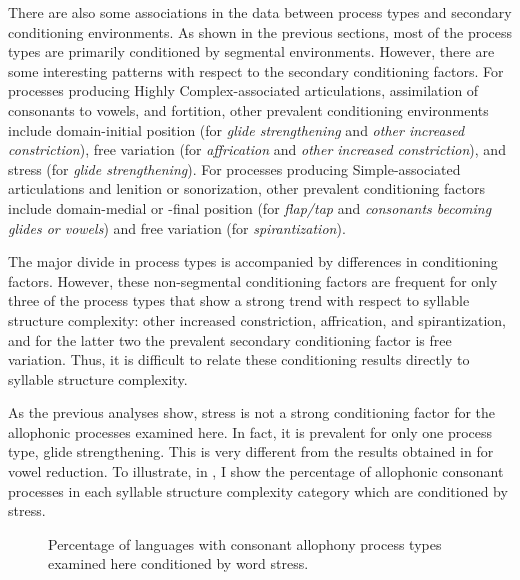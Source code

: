   There are also some associations in the data between process types and secondary conditioning environments. As shown in the previous sections, most of the process types are primarily conditioned by segmental environments. However, there are some interesting patterns with respect to the secondary conditioning factors. For processes producing Highly Complex-associated articulations, assimilation of consonants to vowels, and fortition, other prevalent conditioning environments include domain-initial position (for \textit{glide strengthening} and \textit{other increased constriction}), free variation (for \textit{affrication} and \textit{other increased constriction}), and stress (for \textit{glide strengthening}). For processes producing Simple-associated articulations and lenition or sonorization, other prevalent conditioning factors include domain-medial or -final position (for \textit{flap/tap} and \textit{consonants becoming glides or vowels}) and free variation (for \textit{spirantization}). 

  The major divide in process types is accompanied by differences in conditioning factors. However, these non-segmental conditioning factors are frequent for only three of the process types that show a strong trend with respect to syllable structure complexity: other increased constriction, affrication, and spirantization, and for the latter two the prevalent secondary conditioning factor is free variation. Thus, it is difficult to relate these conditioning results directly to syllable structure complexity.

  As the previous analyses show, stress is not a strong conditioning factor for the allophonic processes examined here. In fact, it is prevalent for only one process type, glide strengthening. This is very different from the results obtained in  for vowel reduction. To illustrate, in , I show the percentage of allophonic consonant processes in each syllable structure complexity category which are conditioned by stress.

  
\begin{figure}
\caption{\label{fig:7.11}Percentage of languages with consonant allophony process types examined here conditioned by word stress.}
\end{figure}

